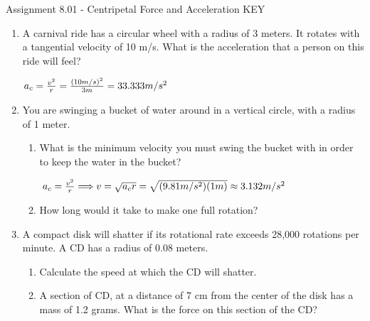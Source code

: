 \documentclass[letterpaper, 12pt]{article}
\newcommand{\assnum}{Assignment 8.01}
\newcommand{\assname}{Centripetal Force and Acceleration KEY}
\begin{document}
\fancyfoot[r]{\assnum}	


\begin{center} \assnum{} - \assname{}
\end{center}

\begin{enumerate}
	\item A carnival ride has a circular wheel with a radius of 3 meters.  It rotates with a tangential velocity of 10 m/s.  What is the acceleration that a person on this ride will feel?
		
		\color{red}
		\begin{center}
		$ a_c = \frac{v^2}{r} = \frac{(10m/s)^2}{3m} = 33.333 m/s^2
		\vspace{.15in} 			$
		\end{center}
		\color{black}
	
	\item You are swinging a bucket of water around in a vertical circle, with a radius of 1 meter.  
	\begin{enumerate}
		\item What is the minimum velocity you must swing the bucket with in order to keep the water in the bucket?
		\vspace{.25in} 	
		\color{red}
		\begin{center}
		$ a_c = \frac{v^2}{r} \Longrightarrow v = \sqrt{a_cr} = \sqrt{(9.81m/s^2)(1m)} \approx 3.132 m/s^2
		\vspace{.25in} 			$
		\end{center}
		\color{black}
	
	
	
		\item 	How long would it take to make one full rotation?
			\vspace{1.25in}
	\end{enumerate}
	
	\item A compact disk will shatter if its rotational rate exceeds 28,000 rotations per minute.  A CD has a radius of 0.08 meters.
		\begin{enumerate}
			\item Calculate the speed at which the CD will shatter.
				\vspace{1in}
			\item A section of CD, at a distance of 7 cm from the center of the disk has a mass of 1.2 grams. What is the force on this section of the CD?
				\vspace{1in}
		\end{enumerate}
	

\end{enumerate}
\end{document}
